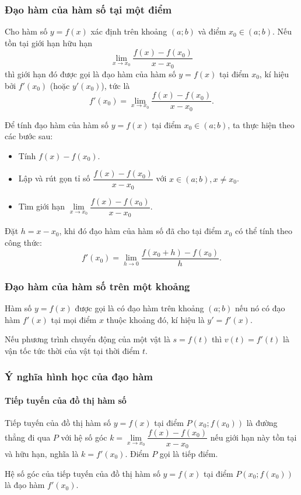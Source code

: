 \begin{bt}
\begin{tomtat}
	\subsubsection{Đạo hàm của hàm số tại một điểm}
	\begin{dn}
	Cho hàm số $y=f(x)$ xác định trên khoảng $(a;b)$ và điểm $x_0 \in (a;b)$.
	Nếu tồn tại giới hạn hữu hạn 
	\[\lim\limits_{x \to x_0} \dfrac{f(x)-f(x_0)}{x-x_0}\]
	thì giới hạn đó được gọi là đạo hàm của hàm số $y=f(x)$ tại điểm $x_0$, kí hiệu bởi $f'(x_0)$ (hoặc $y'(x_0)$), tức là 
	\[f'(x_0)=\lim\limits_{x \to x_0} \dfrac{f(x)-f(x_0)}{x-x_0}.\]
	\end{dn}
	\begin{note}
	Để tính đạo hàm của hàm số $y=f(x)$ tại điểm $x_0\in (a;b)$, ta thực hiện theo các bước sau:
	\begin{itemize}
	\item Tính $f(x)-f(x_0)$.
	\item Lập và rút gọn tỉ số $\dfrac{f(x)-f(x_0)}{x-x_0}$ với $x \in (a;b),x \ne x_0$.
	\item Tìm giới hạn $\lim\limits_{x \to x_0} \dfrac{f(x)-f(x_0)}{x-x_0}$.
	\end{itemize}
	\end{note}
	\begin{note}
	Đặt $h=x-x_0$, khi đó đạo hàm của hàm số đã cho tại điểm $x_0$ có thể tính theo công thức:\\
	$$f'(x_0)=\lim\limits_{h \to 0} \dfrac{f(x_0+h)-f(x_0)}{h}.$$
	\end{note}
	\subsubsection{Đạo hàm của hàm số trên một khoảng}
	\begin{dn}
	Hàm số $y=f(x)$ được gọi là có đạo hàm trên khoảng $(a;b)$ nếu nó có đạo hàm $f'(x)$ tại mọi điểm $x$ thuộc khoảng đó, kí hiệu là $y'=f'(x)$.
	\end{dn}	
	\begin{note}
	Nếu phương trình chuyển động của một vật là $s=f(t)$ thì $v(t)=f'(t)$ là vận tốc tức thời của vật tại thời điểm $t$.
	\end{note}
	\subsubsection{Ý nghĩa hình học của đạo hàm}
	\paragraph{Tiếp tuyến của đồ thị hàm số}
	\begin{dn}
	Tiếp tuyến của đồ thị hàm số $y=f(x)$ tại điểm $P(x_0;f(x_0))$ là đường thẳng đi qua $P$ với hệ số góc $k=\lim\limits_{x \to x_0} \dfrac{f(x)-f(x_0)}{x-x_0}$ nếu giới hạn này tồn tại và hữu hạn, nghĩa là $k=f'(x_0)$. Điểm $P$ gọi là tiếp điểm.
	\end{dn}
	\begin{nx}
	Hệ số góc của tiếp tuyến của đồ thị hàm số $y=f(x)$ tại điểm $P(x_0;f(x_0))$ là đạo hàm $f'(x_0)$.
	\end{nx}

\end{tomtat}
\end{bt}
